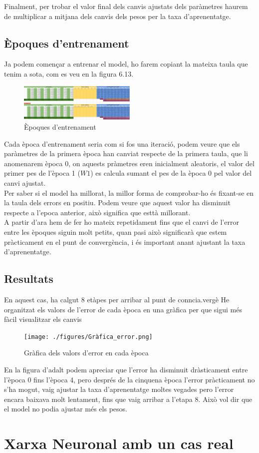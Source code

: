 Finalment, per trobar el valor final dels canvis ajustats dels paràmetres haurem de multiplicar a mitjana dels canvis dels pesos per la taxa d'aprenentatge.
\subsection{Èpoques d'entrenament}
Ja podem començar a entrenar el model, ho farem copiant la mateixa taula que tenim a sota, com es veu en la figura 6.13.

\begin{figure}[H]
    \centering
    \includegraphics[width=0.5\textwidth]{./figures/Etapa_1.png}
    \caption{Èpoques d'entrenament}
\end{figure}

Cada època d'entrenament seria com si fos una iteració, podem veure que els paràmetres de la primera època han canviat respecte de la primera taula, que li anomenarem època 0, on aquests pràmetres eren inicialment aleatoris, el valor del primer pes de l'època 1 ($W1$) es calcula sumant el pes de la època 0 pel valor del canvi ajustat.\\
Per saber si el model ha millorat, la millor forma de comprobar-ho és fixant-se en la taula dels errors en positiu. Podem veure que aquest valor ha disminuit respecte a l'epoca anterior, això significa que esttà millorant.\\
A partir d'ara hem de fer ho mateix repetidament fins que el canvi de l'error entre les èpoques siguin molt petits, quan pasi això significarà que estem pràcticament en el punt de convergència, i és important anant ajustant la taxa d'aprenentatge.
\subsection{Resultats}
En aquest cas, ha calgut 8 etàpes per arribar al punt de conncia.vergè He organitzat els valors de l'error de cada època en una gràfica per que sigui més fàcil visualitzar els canvis


\begin{figure}[H]
    \centering
    \texttt{[image: ./figures/Gràfica\_error.png]}
    \caption{Gràfica dels valors d'error en cada època}
\end{figure}



En la figura d'adalt podem apreciar que l'error ha disminuit dràsticament entre l'època 0 fins l'època 4, pero després de la cinquena època l'error pràcticament no s'ha mogut, vaig ajustar la taxa d'aprenentatge moltes vegades pero l'error encara baixava molt lentament, fins que vaig arribar a l'etapa 8. Això vol dir que el model no podia ajustar més els pesos.


\section{Xarxa Neuronal amb un cas real}\label{sec:12}
